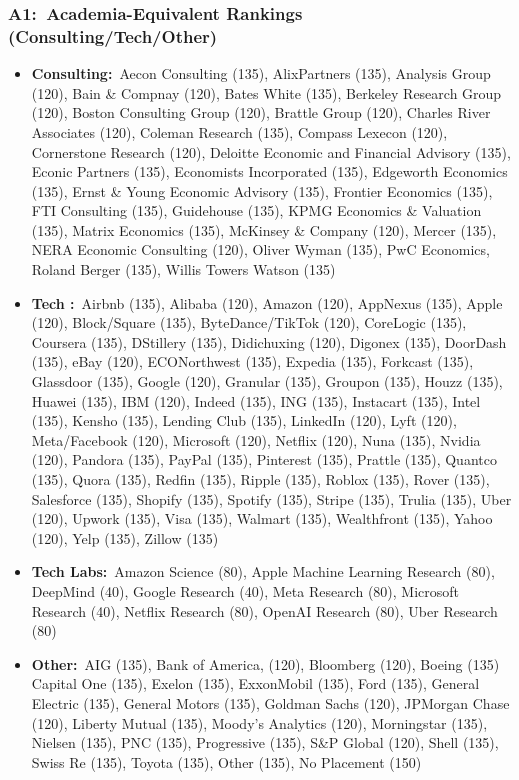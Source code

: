 \documentclass[12pt, aspectratio=169]{beamer}
\newcommand{\scripttiny}{\fontsize{7pt}{8pt}\selectfont}
\begin{document}
\begin{frame}[label=aercto]
\frametitle{A1:\ Academia-Equivalent Rankings (Consulting/Tech/Other)}
\addtocounter{framenumber}{-1}
\begin{itemize}
\scripttiny
\item \textbf{Consulting:}\ Aecon Consulting (135), AlixPartners (135), Analysis Group (120), Bain \& Compnay (120), Bates White (135), Berkeley Research Group (120), Boston Consulting Group (120), Brattle Group (120), Charles River Associates (120), Coleman Research (135), Compass Lexecon (120), Cornerstone Research (120), Deloitte Economic and Financial Advisory (135), Econic Partners (135), Economists Incorporated (135), Edgeworth Economics (135), Ernst \& Young Economic Advisory (135), Frontier Economics (135), FTI Consulting (135), Guidehouse (135), KPMG Economics \& Valuation (135), Matrix Economics (135), McKinsey \& Company (120), Mercer (135), NERA Economic Consulting (120), Oliver Wyman (135), PwC Economics, Roland Berger (135), Willis Towers Watson (135)
\item \textbf{Tech \citep{athey2019}:}\ Airbnb (135), Alibaba (120), Amazon (120), AppNexus (135), Apple (120), Block/Square (135), ByteDance/TikTok (120), CoreLogic (135), Coursera (135), DStillery (135), Didichuxing (120), Digonex (135), DoorDash (135), eBay (120), ECONorthwest (135), Expedia (135), Forkcast (135), Glassdoor (135), Google (120), Granular (135), Groupon (135), Houzz (135), Huawei (135), IBM (120), Indeed (135), ING (135), Instacart (135), Intel (135), Kensho (135), Lending Club (135), LinkedIn (120), Lyft (120), Meta/Facebook (120), Microsoft (120), Netflix (120), Nuna (135), Nvidia (120), Pandora (135), PayPal (135), Pinterest (135), Prattle (135), Quantco (135), Quora (135), Redfin (135), Ripple (135), Roblox (135), Rover (135), Salesforce (135), Shopify (135), Spotify (135), Stripe (135), Trulia (135), Uber (120), Upwork (135), Visa (135), Walmart (135), Wealthfront (135), Yahoo (120), Yelp (135), Zillow (135)
\item \textbf{Tech Labs:}\ Amazon Science (80), Apple Machine Learning Research (80), DeepMind (40), Google Research (40), Meta Research (80), Microsoft Research (40), Netflix Research (80), OpenAI Research (80), Uber Research (80)
\item \textbf{Other:}\ AIG (135), Bank of America, (120), Bloomberg (120), Boeing (135) Capital One (135), Exelon (135), ExxonMobil (135), Ford (135), General Electric (135), General Motors (135), Goldman Sachs (120), JPMorgan Chase (120), Liberty Mutual (135), Moody's Analytics (120), Morningstar (135), Nielsen (135), PNC (135), Progressive (135), S\&P Global (120), Shell (135), Swiss Re (135), Toyota (135), Other (135), No Placement (150)
\vspace{5pt}
\end{itemize}
\hyperlink{dd}{}
\end{frame}
\end{document}
